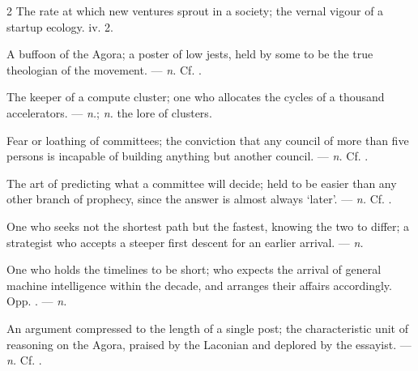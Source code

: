 \begin{multicols}{2}
 The rate at which new ventures sprout in a society; the vernal vigour of a startup ecology.   iv. 2.

 A buffoon of the Agora; a poster of low jests, held by some to be the true theologian of the movement.  —  \textit{n.} Cf. .

 The keeper of a compute cluster; one who allocates the cycles of a thousand accelerators.   —  \textit{n.};  \textit{n.} the lore of clusters.

 Fear or loathing of committees; the conviction that any council of more than five persons is incapable of building anything but another council. —  \textit{n.} Cf. .

 The art of predicting what a committee will decide; held to be easier than any other branch of prophecy, since the answer is almost always ‘later’. —  \textit{n.} Cf. .

 One who seeks not the shortest path but the fastest, knowing the two to differ; a strategist who accepts a steeper first descent for an earlier arrival. —  \textit{n.}

 One who holds the timelines to be short; who expects the arrival of general machine intelligence within the decade, and arranges their affairs accordingly. Opp. . —  \textit{n.}

 An argument compressed to the length of a single post; the characteristic unit of reasoning on the Agora, praised by the Laconian and deplored by the essayist. —  \textit{n.} Cf. .


\end{multicols}
